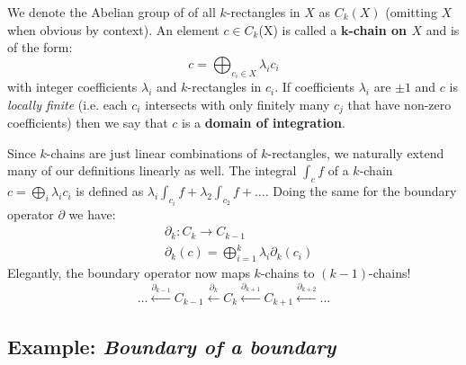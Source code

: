 \begin{definition}
We denote the Abelian group of of all $k$-rectangles in $X$ as $C_k(X)$ (omitting $X$ when obvious by context).
An element $c \in C_k$(X) is called a \textbf{$\boldsymbol{k}$-chain on $X$} and is of the form:
\begin{equation*}
	c = \bigoplus_{c_i \in X} \lambda_i c_i
\end{equation*}
with integer coefficients $\lambda_i$ and  $k$-rectangles in $c_i$.
If coefficients $\lambda_i$ are $\pm 1$ and $c$ is \emph{locally finite} (i.e. each $c_i$ intersects with only finitely many $c_j$ that have non-zero coefficients) then we say that $c$ is a \textbf{domain of integration}.
\end{definition}


		
Since $k$-chains are just linear combinations of $k$-rectangles, we naturally extend many of our definitions linearly as well.
The integral $\int_c f$ of a $k$-chain $c=\bigoplus_i \lambda_i c_i$ is defined as $\lambda_i \int_{c_i} f  + \lambda_2 \int_{c_2} f + \ldots$.
Doing the same for the boundary operator $\partial$ we have:
\begin{align*}
	&\partial_k: C_k \to C_{k-1} \\
	&\partial_k(c) = \bigoplus_{i=1}^k \lambda_i \partial_k(c_i)
\end{align*}
Elegantly, the boundary operator now maps $k$-chains to $(k-1)$-chains!
\begin{equation*}
	\ldots \xleftarrow{\partial_{k-1}} C_{k-1} \xleftarrow{\partial_{k}} C_k \xleftarrow{\partial_{k+1}} C_{k+1} \xleftarrow{\partial_{k+2}} ...
\end{equation*}






\subsection{Example: \emph{Boundary of a boundary}}

